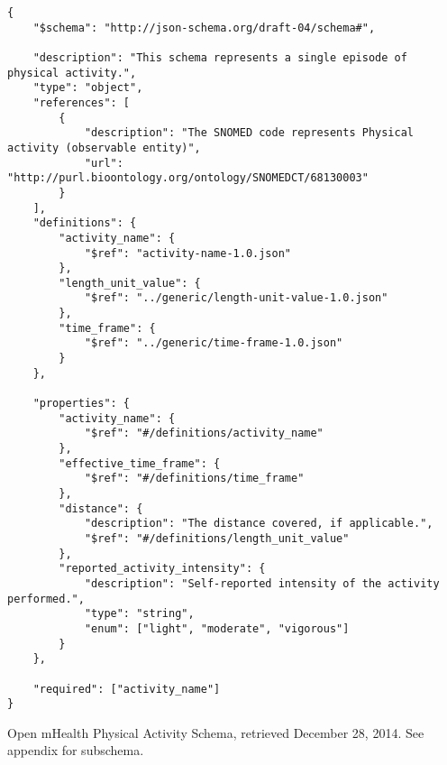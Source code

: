 \begin{listing}
\begin{verbatim}
{     
    "$schema": "http://json-schema.org/draft-04/schema#",

    "description": "This schema represents a single episode of physical activity.",
    "type": "object",
    "references": [
        {
            "description": "The SNOMED code represents Physical activity (observable entity)",
            "url": "http://purl.bioontology.org/ontology/SNOMEDCT/68130003"
        }
    ],
    "definitions": {
        "activity_name": {
            "$ref": "activity-name-1.0.json"
        },
        "length_unit_value": {
            "$ref": "../generic/length-unit-value-1.0.json"
        },
        "time_frame": {
            "$ref": "../generic/time-frame-1.0.json"
        }
    },

    "properties": {
        "activity_name": {
            "$ref": "#/definitions/activity_name"
        },
        "effective_time_frame": {
            "$ref": "#/definitions/time_frame"
        },
        "distance": {
            "description": "The distance covered, if applicable.",
            "$ref": "#/definitions/length_unit_value"
        },
        "reported_activity_intensity": {
            "description": "Self-reported intensity of the activity performed.",
            "type": "string",
            "enum": ["light", "moderate", "vigorous"]
        }
    },

    "required": ["activity_name"]
}
\end{verbatim}
\caption{Open mHealth Physical Activity Schema, retrieved December 28, 2014. See appendix for subschema.} 
\label{listing:physical-activity-json}
\end{listing}


